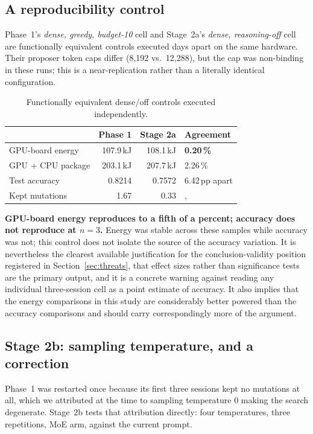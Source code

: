\subsection{A reproducibility control}\label{sec:results:control}

Phase~1's \emph{dense, greedy, budget-10} cell and Stage~2a's \emph{dense,
reasoning-off} cell are functionally equivalent controls executed days apart on
the same hardware. Their proposer token caps differ (8,192 vs.\ 12,288), but the
cap was non-binding in these runs; this is a near-replication rather than a
literally identical configuration.

\begin{table}[htbp]
\centering
\caption{Functionally equivalent dense/off controls executed independently.}
\label{tab:control}
\begin{tabular}{lrrl}
\toprule
& Phase 1 & Stage 2a & Agreement \\
\midrule
GPU-board energy & 107.9\,kJ & 108.1\,kJ & \textbf{0.20\,\%} \\
GPU + CPU package & 203.1\,kJ & 207.7\,kJ & 2.26\,\% \\
Test accuracy  & 0.8214 & 0.7572 & 6.42\,pp apart \\
Kept mutations & 1.67 & 0.33 &, \\
\bottomrule
\end{tabular}
\end{table}

\textbf{GPU-board energy reproduces to a fifth of a percent; accuracy does not
reproduce at $n=3$.} Energy was stable across these samples while accuracy was
not; this control does not isolate the source of the accuracy variation. It is nevertheless the clearest available justification for the
conclusion-validity position registered in Section~\ref{sec:threats}, that effect
sizes rather than significance tests are the primary output, and it is a concrete
warning against reading any individual three-session cell as a point estimate of
accuracy. It also implies that the energy comparisons in this study are
considerably better powered than the accuracy comparisons and should carry
correspondingly more of the argument.

\subsection{Stage 2b: sampling temperature, and a correction}\label{sec:results:temperature}

Phase~1 was restarted once because its first three sessions kept no mutations at
all, which we attributed at the time to sampling temperature 0 making the search
degenerate. Stage~2b tests that attribution directly: four temperatures, three
repetitions, MoE arm, against the current prompt.


